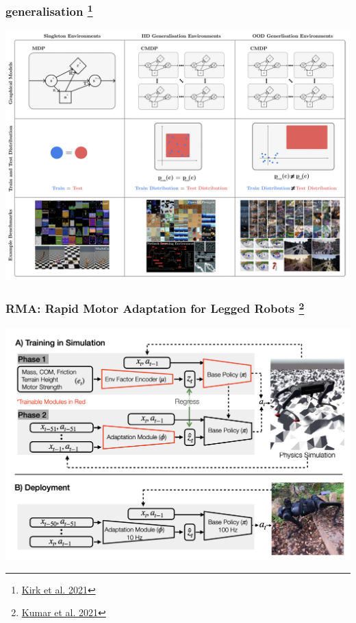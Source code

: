 \documentclass{beamer}
\begin{document}
\begin{frame}
  
  \frametitle{generalisation \footnote{\href{https://arxiv.org/pdf/2111.09794.pdf}{Kirk et al. 2021}}}
 
  \includegraphics[scale=0.25]{../images/generalisation.png}

\end{frame}


\begin{frame}
  
  \frametitle{RMA: Rapid Motor Adaptation for Legged Robots \footnote{\href{https://arxiv.org/pdf/2107.04034.pdf}{Kumar et al. 2021}}}
 
  \includegraphics[scale=0.25]{../images/rma.png}

\end{frame}
\end{document}
